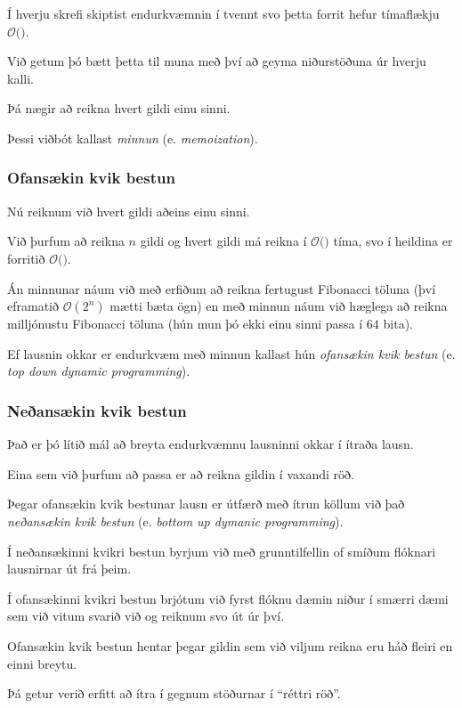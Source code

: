 {
}

{
	{
		\item<1-> Í hverju skrefi skiptist endurkvæmnin í tvennt svo þetta forrit hefur tímaflækju $\mathcal{O}($\onslide<2->{$2^n$}$)$.
		\item<2-> Við getum þó bætt þetta til muna með því að geyma niðurstöðuna úr hverju kalli.
		\item<3-> Þá nægir að reikna hvert gildi einu sinni.
		\item<4-> Þessi viðbót kallast \emph{minnun} (e. \emph{memoization}).
	}
}

{
}

{
	\frametitle{Ofansækin kvik bestun}
	{
		\item<1-> Nú reiknum við hvert gildi aðeins einu sinni.
		\item<2-> Við þurfum að reikna $n$ gildi og hvert gildi má reikna í $\mathcal{O}($$)$ tíma, svo í heildina er forritið
					$\mathcal{O}($\onslide<4->{$\,n\,$}$)$.
		\item<5-> Án minnunar náum við með erfiðum að reikna fertugust Fibonacci töluna (því eframatið $\mathcal{O}(2^n)$ mætti bæta ögn)
					en með minnun náum við hæglega að reikna milljónustu Fibonacci töluna (hún mun þó ekki einu sinni passa í $64$ bita).
		\item<6-> Ef lausnin okkar er endurkvæm með minnun kallast hún \emph{ofansækin kvik bestun} (e. \emph{top down dynamic programming}).
	}
}

{
	\frametitle{Neðansækin kvik bestun}
	{
		\item<1-> Það er þó lítið mál að breyta endurkvæmnu lausninni okkar í ítraða lausn.
		\item<2-> Eina sem við þurfum að passa er að reikna gildin í vaxandi röð.
		\item<3->[]
		\item<4-> Þegar ofansækin kvik bestunar lausn er útfærð með ítrun köllum við það \emph{neðansækin kvik bestun} 
					(e. \emph{bottom up dymanic programming}).
	}
}

{
	{
		\item<1-> Í neðansækinni kvikri bestun byrjum við með grunntilfellin of smíðum flóknari lausnirnar út frá þeim.
		\item<2-> Í ofansækinni kvikri bestun brjótum við fyrst flóknu dæmin niður í smærri dæmi sem við vitum svarið við og reiknum svo út úr því.
		\item<3-> Ofansækin kvik bestun hentar þegar gildin sem við viljum reikna eru háð fleiri en einni breytu.
		\item<4-> Þá getur verið erfitt að ítra í gegnum stöðurnar í ``réttri röð''.
	}
}

